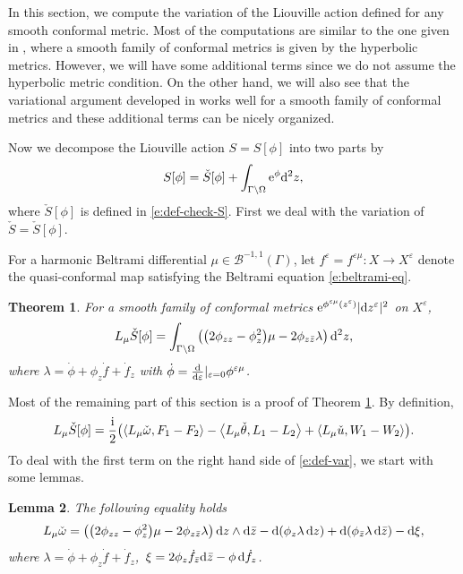 \documentclass[pdftex]{sigma}%
\numberwithin{equation}{section}
\newtheorem{Theorem}{Theorem}[section]
\newtheorem{Lemma}[Theorem]{Lemma}
\newcommand{\vep}{\varepsilon}
\begin{document}
In this section, we compute the variation of the Liouville action defined for any smooth conformal metric. Most of the computations are similar to the one given in \cite{2}, where a smooth family of conformal metrics is given by the hyperbolic metrics.
However, we will have some additional terms since we do not assume the hyperbolic metric condition.
On the other hand, we will also see that the variational argument developed in \cite{2} works well for a smooth family of conformal metrics and these additional terms can be nicely organized.

Now we decompose the Liouville action $S=S[\phi]$ into two parts by
\begin{gather*}
S[\phi]= \check{S}[\phi] + \int_{\Gamma\backslash \Omega} {\rm e}^{\phi} {\rm d}^2z,
\end{gather*}
where $\check{S}[\phi]$ is defined in \eqref{e:def-check-S}. First we deal with the variation of $\check{S}=\check{S}[\phi]$.

For a harmonic Beltrami differential $\mu\in\mathcal{B}^{-1,1}(\Gamma)$, let $f^{\vep}=f^{\vep\mu}\colon X\to X^{\vep}$ denote the quasi-conformal map satisfying the Beltrami equation \eqref{e:beltrami-eq}.

\begin{Theorem}\label{t:firstvariation}
For a smooth family of conformal metrics ${\rm e}^{\phi^{\vep\mu}(z^\vep)}|{\rm d}z^\vep|^2$ on $X^\vep$,
\begin{gather*}
L_{\mu} \check{S}[\phi]=\int_{\Gamma\backslash \Omega} \big(\big(2\phi_{zz}-\phi^2_z\big)\mu -2\phi_{z\bar{z}} \lambda\big)\, {\rm d}^2z,
\end{gather*}
where $\lambda=\dot{\phi}+\phi_z \dot{f} +\dot{f}_z$ with $\dot{\phi}=\frac{\rm d}{{\rm d}\vep}|_{\vep=0} \phi^{\vep\mu}$.
\end{Theorem}

Most of the remaining part of this section is a proof of Theorem \ref{t:firstvariation}. By definition,
\begin{gather}\label{e:def-var}
L_{\mu}\check{S}[\phi] =\frac{\rm i}{2}\bigl(\langle L_{\mu}\check{\omega}, F_1-F_2 \rangle-\big\langle L_{\mu}\check{\theta}, L_1-L_2 \big\rangle+\langle L_{\mu}\check{u}, W_1-W_2 \rangle\bigr).
\end{gather}
To deal with the first term on the right hand side of \eqref{e:def-var}, we start with some lemmas.
\begin{Lemma}\label{l:1}
The following equality holds
\begin{gather}\label{e:1}
L_{\mu}\check{\omega}
=\big(\big(2\phi_{zz}-\phi^2_z\big)\mu -2\phi_{z\bar{z}} \lambda \big)\, {\rm d}z\wedge {\rm d}\bar{z} -{\rm d}(\phi_z \lambda \,{\rm d}z) +{\rm d}(\phi_{\bar{z}} \lambda\, {\rm d}\bar{z}) -{\rm d}\xi,
\end{gather}
where $\lambda=\dot{\phi}+\phi_z \dot{f} +\dot{f}_z$,\, $\xi=2\phi_z\dot{f}_{\bar{z}}{\rm d}\bar{z}-\phi \,{\rm d}\dot{f}_z$.
\end{Lemma}
\end{document}
